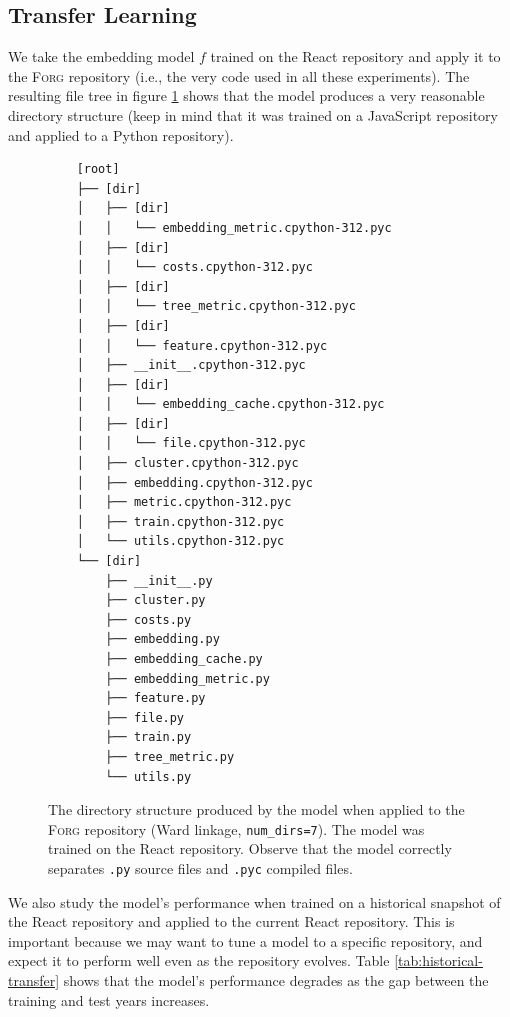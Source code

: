 \documentclass{article}
\begin{document}
\subsection{Transfer Learning}

We take the embedding model $f$ trained on the React repository and apply it to the \textsc{Forg} repository (i.e., the very code used in all these experiments). The resulting file tree in figure \ref{fig:forg-directory-structure} shows that the model produces a very reasonable directory structure (keep in mind that it was trained on a JavaScript repository and applied to a Python repository).

\begin{figure}[H]
  \centering
  \begin{BVerbatim}
    [root]
    ├── [dir]
    │   ├── [dir]
    │   │   └── embedding_metric.cpython-312.pyc
    │   ├── [dir]
    │   │   └── costs.cpython-312.pyc
    │   ├── [dir]
    │   │   └── tree_metric.cpython-312.pyc
    │   ├── [dir]
    │   │   └── feature.cpython-312.pyc
    │   ├── __init__.cpython-312.pyc
    │   ├── [dir]
    │   │   └── embedding_cache.cpython-312.pyc
    │   ├── [dir]
    │   │   └── file.cpython-312.pyc
    │   ├── cluster.cpython-312.pyc
    │   ├── embedding.cpython-312.pyc
    │   ├── metric.cpython-312.pyc
    │   ├── train.cpython-312.pyc
    │   └── utils.cpython-312.pyc
    └── [dir]
        ├── __init__.py
        ├── cluster.py
        ├── costs.py
        ├── embedding.py
        ├── embedding_cache.py
        ├── embedding_metric.py
        ├── feature.py
        ├── file.py
        ├── train.py
        ├── tree_metric.py
        └── utils.py
  \end{BVerbatim}
  \caption{The directory structure produced by the model when applied to the \textsc{Forg} repository (Ward linkage, \texttt{num\_dirs=7}). The model was trained on the React repository. Observe that the model correctly separates \texttt{.py} source files and \texttt{.pyc} compiled files.}
  \label{fig:forg-directory-structure}
\end{figure}

We also study the model's performance when trained on a historical snapshot of the React repository and applied to the current React repository. This is important because we may want to tune a model to a specific repository, and expect it to perform well even as the repository evolves. Table \ref{tab:historical-transfer} shows that the model's performance degrades as the gap between the training and test years increases.
\end{document}
